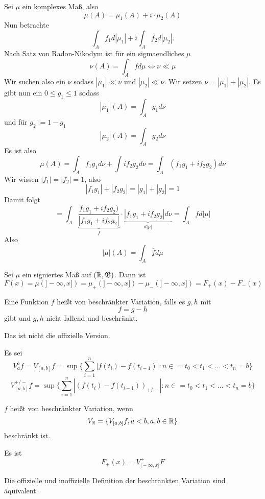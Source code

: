 	\begin{bsp}
		Sei $\mu$ ein komplexes Maß, also
		\[ \mu(A)=\mu_1(A)+i\cdot \mu_2(A) \]
		Nun betrachte
		\[ \int_A f_1 d|\mu_1|+i\int_A f_2 d|\mu_2|. \]
		Nach Satz von Radon-Nikodym ist für ein sigmaendliches $\mu$
		\[ \nu(A)=\int_A f d\mu\Leftrightarrow \nu \ll \mu \]
		Wir suchen also ein $\nu$ sodass $|\mu_1|\ll \nu$ und $|\mu_2|\ll \nu$. Wir setzen $\nu=|\mu_1|+|\mu_2|$. Es gibt nun ein $0\le g_1\le 1$ sodass
		\[ |\mu_1|(A)=\int_A g_1d\nu \]
		und für $g_2:=1-g_1$
		\[ |\mu_2|(A)=\int_A g_2d\nu \]
		Es ist also
		\[ \mu(A)=\int_A f_1g_1 d\nu +\int if_2 g_2d\nu = \int_A (f_1g_1+if_2g_2)d\nu \]
		Wir wissen $|f_1|=|f_2|=1$, also
		\[ |f_1g_1|+|f_2g_2|=|g_1|+|g_2|=1 \]
		Damit folgt
		\[ =\int_A \underbrace{\frac{f_1g_1+if_2g_2)}{|f_1g_1+if_2g_2|}}_f\cdot \underbrace{|f_1g_1+if_2g_2|d\nu}_{d|\mu|}=\int_A fd|\mu| \]
		Also
		\[ |\mu|(A)=\int_A \overline{f}d\mu \]
	\end{bsp}

	\begin{bsp}
		Sei $\mu$ ein signiertes Maß auf $(\mathbb{R}, \mathfrak{B})$. Dann ist
		\[ F(x)=\mu(]-\infty,x])=\mu_+(]-\infty,x])-\mu_-(]-\infty,x])=F_+(x)-F_-(x) \]
	\end{bsp}

	\begin{defi}
		Eine Funktion $f$ heißt von beschränkter Variation, falls es $g,h$ mit
		\[ f=g-h \]
		gibt und $g,h$ nicht fallend und beschränkt. 
	\end{defi}

	\begin{bem}
		Das ist nicht die offizielle Version. 
	\end{bem}

	\begin{defi}
		Es sei
		\[ V_a^b f=V_{[a,b]} f=\sup\{\sum_{i=1}^n|f(t_i)-f(t_{i-1})|: n\in =t_0<t_1<...<t_n=b\} \]
		\[V^{+/-}_{[a,b]} f=\sup\{\sum_{i=1}^n|(f(t_i)-f(t_{i-1}))_{+/-}|: n\in =t_0<t_1<...<t_n=b\} \]
	\end{defi}

	\begin{defi}[offiziell]
		$f$ heißt von beschränkter Variation, wenn
		\[ V_{\mathbb{R}}=\{V_{[a,b]} f, a<b, a,b\in\mathbb{R}\} \]
		beschränkt ist. 
	\end{defi}

	\begin{defi}
		Es ist
		\[ F_+(x)=V_{]-\infty,x]}^+ F \]
	\end{defi}

	\begin{satz}
		Die offizielle und inoffizielle Definition der beschränkten Variation sind äquivalent. 
	\end{satz}
